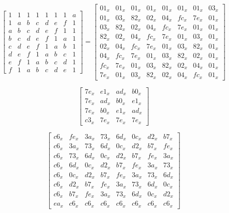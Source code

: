 \begin{equation}\label{mat:fox-mu8}
\begin{bmatrix}
1 & 1 & 1 & 1 & 1 & 1 & 1 & a\\
1 & a & b & c & d & e & f & 1\\
a & b & c & d & e & f & 1 & 1\\
b & c & d & e & f & 1 & a & 1\\
c & d & e & f & 1 & a & b & 1\\
d & e & f & 1 & a & b & c & 1\\
e & f & 1 & a & b & c & d & 1\\
f & 1 & a & b & c & d & e & 1
\end{bmatrix}
=
\begin{bmatrix}
01_x & 01_x & 01_x & 01_x & 01_x & 01_x & 01_x & 03_x\\
01_x & 03_x & 82_x & 02_x & 04_x & fc_x & 7e_x & 01_x\\
03_x & 82_x & 02_x & 04_x & fc_x & 7e_x & 01_x & 01_x\\
82_x & 02_x & 04_x & fc_x & 7e_x & 01_x & 03_x & 01_x\\
02_x & 04_x & fc_x & 7e_x & 01_x & 03_x & 82_x & 01_x\\
04_x & fc_x & 7e_x & 01_x & 03_x & 82_x & 02_x & 01_x\\
fc_x & 7e_x & 01_x & 03_x & 82_x & 02_x & 04_x & 01_x\\
7e_x & 01_x & 03_x & 82_x & 02_x & 04_x & fc_x & 01_x
\end{bmatrix}
\end{equation}

\begin{equation}\label{mat:fox-mu4-inv}
\begin{bmatrix}
7e_x & e1_x & ad_x & b0_x\\
7e_x & ad_x & b0_x & e1_x\\
7e_x & b0_x & e1_x & ad_x\\
c3_x & 7e_x & 7e_x & 7e_x
\end{bmatrix}
\end{equation}

\begin{equation}\label{mat:fox-mu8-inv}
\begin{bmatrix}
c6_x & fe_x & 3a_x & 73_x & 6d_x & 0c_x & d2_x & b7_x\\
c6_x & 3a_x & 73_x & 6d_x & 0c_x & d2_x & b7_x & fe_x\\
c6_x & 73_x & 6d_x & 0c_x & d2_x & b7_x & fe_x & 3a_x\\
c6_x & 6d_x & 0c_x & d2_x & b7_x & fe_x & 3a_x & 73_x\\
c6_x & 0c_x & d2_x & b7_x & fe_x & 3a_x & 73_x & 6d_x\\
c6_x & d2_x & b7_x & fe_x & 3a_x & 73_x & 6d_x & 0c_x\\
c6_x & b7_x & fe_x & 3a_x & 73_x & 6d_x & 0c_x & d2_x\\
ea_x & c6_x & c6_x & c6_x & c6_x & c6_x & c6_x & c6_x
\end{bmatrix}
\end{equation}

